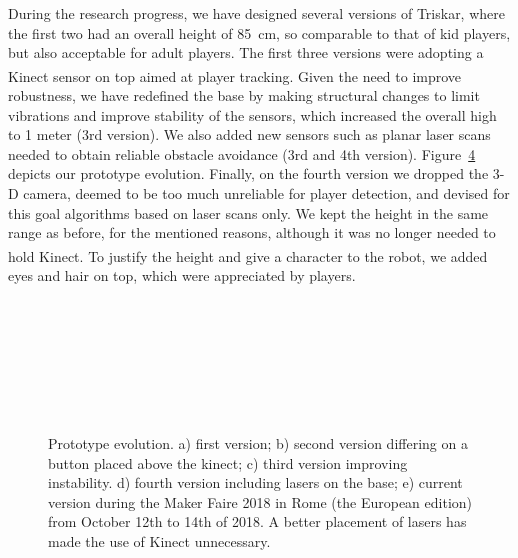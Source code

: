 During the research progress, we have designed several versions of Triskar, where the first two had an overall height of 85~cm, so comparable to that of kid players, but also acceptable for adult players. The first three versions were adopting a Kinect\textsuperscript{\textregistered} sensor on top aimed at player tracking. Given the need to improve robustness, we have redefined the base by making structural changes to limit vibrations and improve stability of the sensors, which increased the overall high to 1 meter (3rd version). We also added new sensors such as planar laser scans needed to obtain reliable obstacle avoidance (3rd and 4th version). Figure~\ref{fig:evolution} depicts our prototype evolution. Finally, on the fourth version we dropped the 3-D camera, deemed to be too much unreliable for player detection, and devised for this goal algorithms based on laser scans only. We kept the height in the same range as before, for the mentioned reasons, although it was no longer needed to hold Kinect\textsuperscript{\textregistered}. To justify the height and give a character to the robot, we added eyes and hair on top, which were appreciated by players.

\begin{figure}[H]
      \centering
      \begin{subfigure}[b]{0.3\textwidth}
      	\centering
	  	\caption{}
      \end{subfigure}
	 ~
	 \begin{subfigure}[b]{0.3\textwidth}
	 	\centering
		\caption{}   
      \end{subfigure}
	 ~
	  \begin{subfigure}[b]{0.3\textwidth}
		\centering
	  	\caption{}\label{robot}
      \end{subfigure}
      ~
      \begin{subfigure}[b]{0.3\textwidth}
      	\centering
      	\label{newrobot}
      	\caption{}
      \end{subfigure}
      ~
      \begin{subfigure}[b]{0.3\textwidth}
	      \centering
	      \label{newrobot}
	      \caption{}
      \end{subfigure}
      \caption{Prototype evolution. a) first version; b) second version differing on a button placed above the kinect; c) third version improving instability. d) fourth version including lasers on the base; e) current version during the Maker Faire 2018 in Rome (the European edition) from October 12th to 14th of 2018. A better placement of lasers has made the use of Kinect unnecessary.}
      \label{fig:evolution}
\end{figure}

